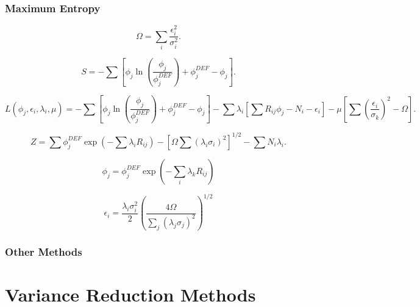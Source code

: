 






\subsubsection{Maximum Entropy}


\begin{equation}\label{eqn:maxed-omega}
\Omega = \sum_i \frac{\epsilon_i^2}{\sigma_i^2} .
\end{equation}

\begin{equation}\label{eqn:maxed-skilling}
S = - \sum [\phi_j \ln (\frac{\phi_j}{\phi_j^{DEF}}) + \phi_j^{DEF} - \phi_j] .
\end{equation}

\begin{equation}\label{eqn:maxed-lagrangian}
L(\phi_j, \epsilon_i, \lambda_i, \mu) = -\sum [\phi_j \ln (\frac{\phi_j}{\phi_j^{DEF}}) + \phi_j^{DEF} - \phi_j] - \sum \lambda_i [\sum R_{ij} \phi_j - N_i - \epsilon_i] - \mu [\sum (\frac{\epsilon_i}{\sigma_k})^2 - \Omega] .
\end{equation}

\begin{equation}\label{eqn:maxed-potential}
Z = \sum \phi_j^{DEF} \exp(-\sum \lambda_i R_{ij}) - [\Omega \sum (\lambda_i \sigma_i)^2]^{1/2} - \sum N_i \lambda_i .
\end{equation}

\begin{equation}\label{eqn:maxed-flux}
\phi_j = \phi_j^{DEF} \exp(- \sum_i \lambda_k R_{ij})
\end{equation}

\begin{equation}\label{eqn:maxed-error}
\epsilon_i = \frac{\lambda_i \sigma_i^2}{2} (\frac{4 \Omega}{\sum_j (\lambda_j \sigma_j)^2})^{1/2}
\end{equation}







\subsubsection{Other Methods}


\section{Variance Reduction Methods}


